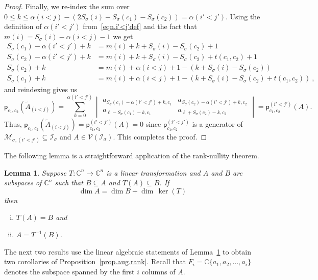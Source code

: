 \documentclass[11pt]{amsart}
\newtheorem{lemma}[theorem]{Lemma}
\theoremstyle{remark}
\theoremstyle{remark}
\theoremstyle{definition}
\theoremstyle{definition}
\theoremstyle{definition}
\numberwithin{equation}{section}
\newcommand{\C}{\mathbb{C}}           %
\renewcommand{\ker}{\operatorname{ker }}
\newcommand{\gs}{\sigma}
\newcommand{\ci}{\mathcal{I}}
\newcommand{\cm}{\mathcal{M}}
\newcommand{\cv}{\mathcal{V}}
\newcommand{\al}{\alpha}
\newcommand{\pl}{\mathsf{p}}
\newcommand{\mi}[1]{m(#1)}
\begin{document}
\begin{proof}
Finally, we re-index the sum over $0\leq k \leq \al(i<j) - \left( 2S_\gs(i) - S_\gs(c_1)-S_\gs(c_2) \right) = \al (i'<j')$. Using the definition of $\al(i'<j')$ from~\eqref{eqn.i'<j'def} and the fact that $\mi{i} = S_\gs(i)-\al(i<j)-1$ we get  
\begin{align*}
S_\gs(c_1) - \al(i'<j')+k & = \mi{i} + k + S_\gs(i)-S_{\gs}(c_2)+1  \\
S_\gs(c_2) - \al(i'<j')+k &= \mi{i} + k + S_\gs(i)-S_{\gs}(c_2) + t(c_1, c_2)+1 \\
S_\gs(c_2)+k & = \mi{i} +\al(i<j) +1 - \left( k + S_\gs(i)-S_\gs(c_2) \right) \\
S_\gs(c_1)+k & = \mi{i} +\al(i<j) +1 - \left( k + S_\gs(i)-S_\gs(c_2) +t(c_1,c_2)  \right) \ ,
\end{align*}
and reindexing gives us 
\[
\pl_{c_1, c_2}(\widetilde A_{(i<j)})  = \sum_{k=0}^{\al(i'<j')} \begin{vmatrix} a_{S_\gs(c_1)-\al(i'<j')+k, c_1} &  a_{S_\gs(c_2)-\al(i'<j')+k, c_2} \\  a_{\ell-S_\gs(c_1)-k,c_1}  & a_{\ell + S_\gs(c_2) - k, c_2 }\end{vmatrix} = \pl_{c_1, c_2}^{(i'<j')} (A).
\]
Thus, $\pl_{c_1, c_2}(\widetilde A_{(i<j)}) = \pl_{c_1, c_2}^{(i'<j')} (A)=0$ since $\pl_{c_1, c_2}^{(i'<j')}$ is a generator of $\cm_{\gs, (i'<j')} \subseteq \ci_\gs$ and $A\in \cv(\ci_\gs)$. This completes the proof. 
\end{proof}



The following lemma is a straightforward application of the rank-nullity theorem. 

\begin{lemma}\label{lem.linearalg} Suppose $T: \C^n \to \C^n$ is a linear transformation and $A$ and $B$ are subspaces of $\C^n$ such that $B\subseteq A$ and $T(A)\subseteq B$. If 
\[
\dim A = \dim B + \dim\,\ker(T)
\]
then 
\begin{enumerate}[(i)]
\item \label{lem.linearalg1} $T(A)=B$ and 
\item \label{lem.linearalg2} $A=T^{-1}(B)$.
\end{enumerate}
\end{lemma}


The next two results use the linear algebraic statements of Lemma~\ref{lem.linearalg} to obtain two corollaries of Proposition~\ref{prop.aug.rank}. Recall that $F_i =  \C\{a_1, a_2, \ldots, a_i\}$ denotes the subspace spanned by the first $i$ columns of $A$. 
\end{document}
